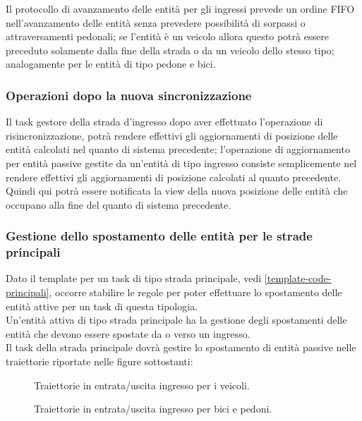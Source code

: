 Il protocollo di avanzamento delle entità per gli ingressi prevede un ordine
\ac{FIFO} nell'avanzamento delle entità senza prevedere possibilità di sorpassi
o attraversamenti pedonali; se l'entità è un veicolo allora questo potrà essere preceduto solamente dalla fine della strada o da un veicolo dello stesso tipo; analogamente per le entità di tipo pedone e bici.
\subsubsection*{Operazioni dopo la nuova sincronizzazione} 
Il task gestore della strada d'ingresso dopo aver effettuato l'operazione di risincronizzazione, potrà rendere effettivi gli aggiornamenti di posizione delle entità calcolati nel quanto di sistema precedente; l'operazione di aggiornamento per entità passive gestite da un'entità di tipo ingresso consiste semplicemente nel rendere effettivi gli aggiornamenti di posizione calcolati al quanto precedente. Quindi qui potrà essere notificata la view della nuova posizione delle entità che occupano alla fine del quanto di sistema precedente.  
\subsubsection{Gestione dello spostamento delle entità per le strade principali}
Dato il template per un task di tipo strada principale, vedi \ref{template-code-principali}, occorre stabilire le regole per poter effettuare lo spostamento delle entità attive per un task di questa tipologia.\\
Un'entità attiva di tipo strada principale ha la gestione degli spostamenti
delle entità che devono essere spostate da o verso un ingresso. \\ Il task della
strada principale dovrà gestire lo spostamento di entità passive nelle
traiettorie riportate nelle figure sottostanti:

\begin{figure}[H] %
\caption{Traiettorie in entrata/uscita ingresso per i veicoli.}
\label{fig:Traiettorie in entrata/uscita ingresso per i veicoli}
\end{figure}

\begin{figure}[H] %
\caption{Traiettorie in entrata/uscita ingresso per bici e pedoni.}
\label{fig:Traiettorie in entrata/uscita ingresso per bici e pedoni}
\end{figure}

